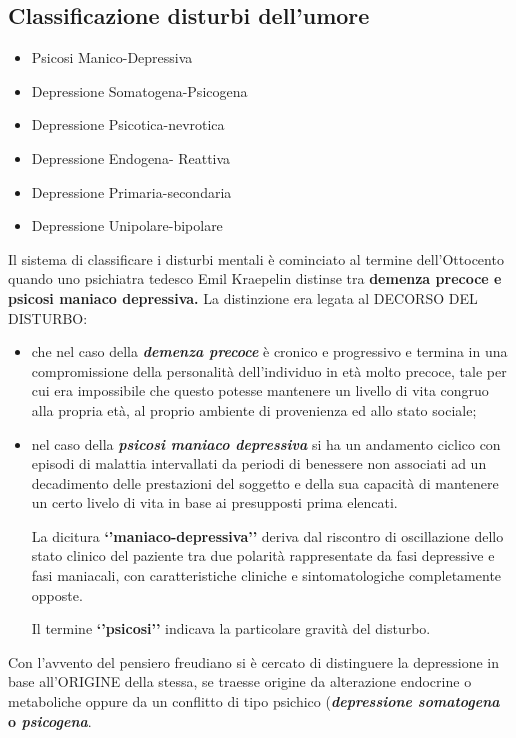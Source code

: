 \subsection{Classificazione disturbi dell'umore}

\begin{itemize}
\item
  Psicosi Manico-Depressiva
\item
  Depressione Somatogena-Psicogena
\item
  Depressione Psicotica-nevrotica
\item
  Depressione Endogena- Reattiva
\item
  Depressione Primaria-secondaria
\item
  Depressione Unipolare-bipolare
\end{itemize}

Il sistema di classificare i disturbi mentali è cominciato al termine
dell'Ottocento quando uno psichiatra tedesco Emil Kraepelin distinse tra
\textbf{demenza precoce e psicosi maniaco depressiva.} La distinzione
era legata al DECORSO DEL DISTURBO:

\begin{itemize}
\item
  che nel caso della \emph{\textbf{demenza precoce}} è cronico e
  progressivo e termina in una compromissione della personalità
  dell'individuo in età molto precoce, tale per cui era impossibile che
  questo potesse mantenere un livello di vita congruo alla propria età,
  al proprio ambiente di provenienza ed allo stato sociale;
\item
  nel caso della \emph{\textbf{psicosi maniaco depressiva}} si ha un
  andamento ciclico con episodi di malattia intervallati da periodi di
  benessere non associati ad un decadimento delle prestazioni del
  soggetto e della sua capacità di mantenere un certo livelo di vita in
  base ai presupposti prima elencati.

  La dicitura \textbf{`'maniaco-depressiva''} deriva dal riscontro di
  oscillazione dello stato clinico del paziente tra due polarità
  rappresentate da fasi depressive e fasi maniacali, con caratteristiche
  cliniche e sintomatologiche completamente opposte.

  Il termine \textbf{`'psicosi''} indicava la particolare gravità del
  disturbo.
\end{itemize}

Con l'avvento del pensiero freudiano si è cercato di distinguere la
depressione in base all'ORIGINE della stessa, se traesse origine da
alterazione endocrine o metaboliche oppure da un conflitto di tipo
psichico (\textbf{\emph{depressione somatogena} o \emph{psicogena}}.

